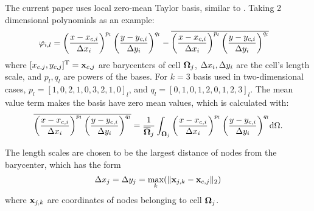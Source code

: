 The current paper uses local zero-mean Taylor basis, similar to
\cite{wang2017compact_VR}.
Taking 2 dimensional polynomials as an example:
\begin{equation}
    \begin{aligned}
        \varphi_{i,l} & =
        \left(\frac{x - x_{c,i}}{{\Delta} x_i}\right)^{p_l}
        \left(\frac{y - y_{c,i}}{{\Delta} y_i}\right)^{q_l}
        -
        \overline{
            \left(\frac{x - x_{c,i}}{{\Delta} x_i}\right)^{p_l}
            \left(\frac{y - y_{c,i}}{{\Delta} y_i}\right)^{q_l}
        }
    \end{aligned}
\end{equation}
where $[x_{c,j},y_{c,j}]^\mathrm{T} = \mathbf{x}_{c,j}$ are barycenters of cell $\mathbf{\Omega}_{j}$,
${\Delta} x_i,{\Delta} y_i$ are the cell's length scale, and $p_l,q_l$ are
powers of the bases. For $k=3$ basis used in two-dimensional cases,
$p_l=[1,0,2,1,0,3,2,1,0]_l$,
and $q_l=[0,1,0,1,2,0,1,2,3]_l$.
The mean value term makes the basis have zero mean values,
which is calculated with:
\begin{equation}
    \overline{
        \left(\frac{x - x_{c,i}}{{\Delta} x_i}\right)^{p_l}
        \left(\frac{y - y_{c,i}}{{\Delta} y_i}\right)^{q_l}
    }
    =
    \frac{1}{\overline{\mathbf{\Omega}}_j}\int_{\mathbf{\Omega}_j}{
        \left(\frac{x - x_{c,i}}{{\Delta} x_i}\right)^{p_l}
        \left(\frac{y - y_{c,i}}{{\Delta} y_i}\right)^{q_l}
    }\dd \Omega .
\end{equation}

The length scales are chosen to be the largest distance of nodes from the
barycenter, which has the form
\begin{equation}
    {\Delta} x_j = {\Delta} y_j = \max_k(\|\mathbf{x}_{j,k} - \mathbf{x}_{c,j}\|_2)
\end{equation}
where $\mathbf{x}_{j,k}$ are coordinates of nodes belonging to cell $\mathbf{\Omega}_{j}$.

